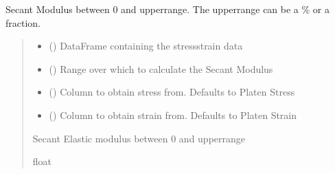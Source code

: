 \documentclass[letterpaper,10pt,english]{sphinxmanual}
\begin{document}
\begin{fulllineitems}
\begin{fulllineitems}
\label{\detokenize{openfdem:openfdem.openfdem.Model.Esec_mod}}
\pysigstartsignatures
{}
\pysigstopsignatures
\sphinxAtStartPar
Secant Modulus between 0 and upperrange. The upperrange can be a \% or a fraction.
\begin{quote}\begin{description}
\begin{itemize}
\item {} 
\sphinxAtStartPar
{} () \textendash{} DataFrame containing the stress\sphinxhyphen{}strain data

\item {} 
\sphinxAtStartPar
{} () \textendash{} Range over which to calculate the Secant Modulus

\item {} 
\sphinxAtStartPar
{} () \textendash{} Column to obtain stress from. Defaults to Platen Stress

\item {} 
\sphinxAtStartPar
{} () \textendash{} Column to obtain strain from. Defaults to Platen Strain

\end{itemize}

\sphinxAtStartPar
Secant Elastic modulus between 0 and upperrange

\sphinxAtStartPar
float


\end{description}
\end{quote}
\end{fulllineitems}
\end{fulllineitems}
\end{document}
